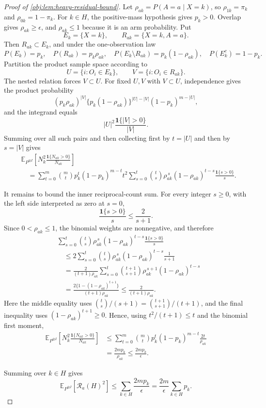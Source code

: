 \begin{proof}[Proof of \cref{obj:lem:heavy-residual-bound}]
Let \(\rho_{ak}=P(A=a\mid X=k)\), so \(\rho_{1k}=\pi_k\) and \(\rho_{0k}=1-\pi_k\). For \(k\in H\), the positive-mass hypothesis gives \(p_k>0\). Overlap gives \(\rho_{ak}\ge\epsilon\), and \(\rho_{ak}\le1\) because it is an arm probability. Put
\[
E_k=\{X=k\},
\qquad
R_{ak}=\{X=k,A=a\}.
\]
Then \(R_{ak}\subset E_k\), and under the one-observation law
\[
P(E_k)=p_k,
\quad
P(R_{ak})=p_k\rho_{ak},
\quad
P(E_k\setminus R_{ak})=p_k(1-\rho_{ak}),
\quad
P(E_k^c)=1-p_k.
\]
Partition the product sample space according to
\[
U=\{i:O_i\in E_k\},
\qquad
V=\{i:O_i\in R_{ak}\}.
\]
The nested relation forces \(V\subset U\). For fixed \(U,V\) with \(V\subset U\), independence gives the product probability
\[
(p_k\rho_{ak})^{|V|}\{p_k(1-\rho_{ak})\}^{|U|-|V|}(1-p_k)^{m-|U|},
\]
and the integrand equals
\[
|U|^2\frac{\mathbf 1\{|V|>0\}}{|V|}.
\]
Summing over all such pairs and then collecting first by \(t=|U|\) and then by \(s=|V|\) gives
\[
\begin{aligned}
&\mathbb E_{P^{\otimes I}}\!\left[
N_k^2\frac{\mathbf 1\{N_{ak}>0\}}{N_{ak}}
\right] \\
&\quad=
\sum_{t=0}^{m}{m\choose t}p_k^t(1-p_k)^{m-t}t^2
\sum_{s=0}^{t}{t\choose s}\rho_{ak}^{\,s}(1-\rho_{ak})^{t-s}
\frac{\mathbf 1\{s>0\}}{s}.
\end{aligned}
\]

It remains to bound the inner reciprocal-count sum. For every integer \(s\ge0\), with the left side interpreted as zero at \(s=0\),
\[
\frac{\mathbf 1\{s>0\}}{s}\le \frac{2}{s+1}.
\]
Since \(0<\rho_{ak}\le1\), the binomial weights are nonnegative, and therefore
\[
\begin{aligned}
&\sum_{s=0}^{t}{t\choose s}\rho_{ak}^{\,s}(1-\rho_{ak})^{t-s}
\frac{\mathbf 1\{s>0\}}{s}\\
&\quad\le
2\sum_{s=0}^{t}{t\choose s}\rho_{ak}^{\,s}(1-\rho_{ak})^{t-s}\frac{1}{s+1}\\
&\quad=
\frac{2}{(t+1)\rho_{ak}}
\sum_{s=0}^{t}{t+1\choose s+1}\rho_{ak}^{\,s+1}(1-\rho_{ak})^{t-s}\\
&\quad=
\frac{2\{1-(1-\rho_{ak})^{t+1}\}}{(t+1)\rho_{ak}}
\le
\frac{2}{(t+1)\rho_{ak}}.
\end{aligned}
\]
Here the middle equality uses
\({t\choose s}/(s+1)={t+1\choose s+1}/(t+1)\), and the final inequality uses \((1-\rho_{ak})^{t+1}\ge0\). Hence, using \(t^2/(t+1)\le t\) and the binomial first moment,
\[
\begin{aligned}
\mathbb E_{P^{\otimes I}}\!\left[
N_k^2\frac{\mathbf 1\{N_{ak}>0\}}{N_{ak}}
\right]
&\le
\sum_{t=0}^{m}{m\choose t}p_k^t(1-p_k)^{m-t}\frac{2t}{\rho_{ak}}\\
&=
\frac{2mp_k}{\rho_{ak}}
\le
\frac{2mp_k}{\epsilon}.
\end{aligned}
\]

Summing over \(k\in H\) gives
\[
\mathbb E_{P^{\otimes I}}\!\left[\mathcal R_a(H)^2\right]
\le
\sum_{k\in H}\frac{2mp_k}{\epsilon}
=
\frac{2m}{\epsilon}\sum_{k\in H}p_k .
\]
\end{proof}

